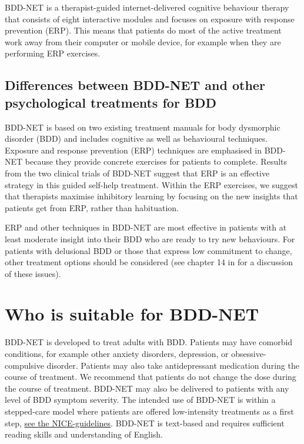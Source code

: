 \documentclass[]{book}
\begin{document}
BDD-NET is a therapist-guided internet-delivered cognitive behaviour therapy that consists of eight interactive modules and focuses on exposure with response prevention (ERP). This means that patients do most of the active treatment work away from their computer or mobile device, for example when they are performing ERP exercises.

\hypertarget{differences-between-bdd-net-and-other-psychological-treatments-for-bdd}{%
\subsection{Differences between BDD-NET and other psychological treatments for BDD}\label{differences-between-bdd-net-and-other-psychological-treatments-for-bdd}}

BDD-NET is based on two existing treatment manuals for body dysmorphic disorder (BDD) \citep{veale2010, wilhelm2013} and includes cognitive as well as behavioural techniques. Exposure and response prevention (ERP) techniques are emphasised in BDD-NET because they provide concrete exercises for patients to complete. Results from the two clinical trials of BDD-NET \citep{enander2014, enander2016} suggest that ERP is an effective strategy in this guided self-help treatment. Within the ERP exercises, we suggest that therapists maximise inhibitory learning \citep{craske2014} by focusing on the new insights that patients get from ERP, rather than habituation.

ERP and other techniques in BDD-NET are most effective in patients with at least moderate insight into their BDD who are ready to try new behaviours. For patients with delusional BDD or those that express low commitment to change, other treatment options should be considered (see chapter 14 in \citet{veale2010} for a discussion of these issues).

\hypertarget{who-is-suitable-for-bdd-net}{%
\section{Who is suitable for BDD-NET}\label{who-is-suitable-for-bdd-net}}

BDD-NET is developed to treat adults with BDD. Patients may have comorbid conditions, for example other anxiety disorders, depression, or obsessive-compulsive disorder. Patients may also take antidepressant medication during the course of treatment. We recommend that patients do not change the dose during the course of treatment. BDD-NET may also be delivered to patients with any level of BDD symptom severity. The intended use of BDD-NET is within a stepped-care model where patients are offered low-intensity treatments as a first step, \href{https://www.nice.org.uk/guidance/CG31/chapter/1-Guidance\#steps-35-treatment-options-for-people-with-ocd-or-bdd}{see the NICE-guidelines}. BDD-NET is text-based and requires sufficient reading skills and understanding of English.
\end{document}
